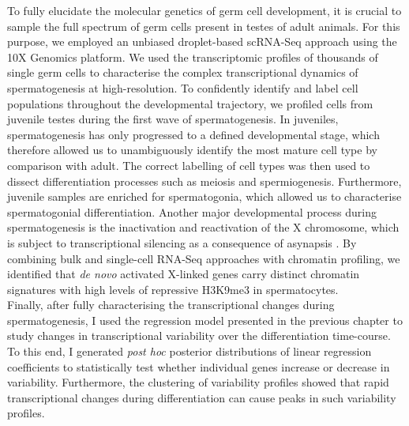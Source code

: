 To fully elucidate the molecular genetics of germ cell development, it is crucial to sample the full spectrum of germ cells present in testes of adult animals. For this purpose, we employed an unbiased droplet-based scRNA-Seq approach using the 10X Genomics\texttrademark{} platform. 
We used the transcriptomic profiles of thousands of single germ cells to characterise the complex transcriptional dynamics of spermatogenesis at high-resolution. To confidently identify and label cell populations throughout the developmental trajectory, we profiled cells from juvenile testes during the first wave of spermatogenesis. In juveniles, spermatogenesis has only progressed to a defined developmental stage, which therefore allowed us to unambiguously identify the most mature cell type by comparison with adult. The correct labelling of cell types was then used to dissect differentiation processes such as meiosis and spermiogenesis. Furthermore, juvenile samples are enriched for spermatogonia, which allowed us to characterise spermatogonial differentiation. Another major developmental process during spermatogenesis is the inactivation and reactivation of the X chromosome, which is subject to transcriptional silencing as a consequence of asynapsis \citep{Turner2007}. By combining bulk and single-cell RNA-Seq approaches with chromatin profiling, we identified that \textit{de novo} activated X-linked genes carry distinct chromatin signatures with high levels of repressive H3K9me3 in spermatocytes. \\

Finally, after fully characterising the transcriptional changes during spermatogenesis, I used the regression model presented in the previous chapter to study changes in transcriptional variability over the differentiation time-course. To this end, I generated \emph{post hoc} posterior distributions of linear regression coefficients to statistically test whether individual genes increase or decrease in variability. Furthermore, the clustering of variability profiles showed that rapid transcriptional changes during differentiation can cause peaks in such variability profiles.
